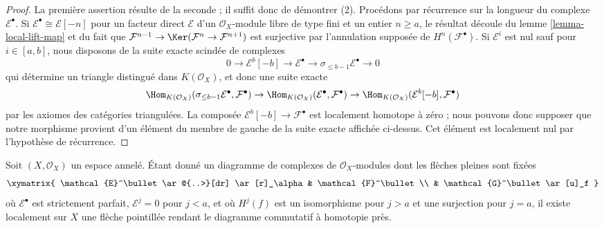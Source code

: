 {\begin{lemma}
\begin{enumerate}
\end{enumerate}

\end{lemma}

\begin{proof}

La première assertion résulte de la seconde ; il suffit donc de démontrer (2). Procédons par récurrence sur la longueur du complexe
$\mathcal{E}^\bullet$. Si $\mathcal{E}^\bullet \cong \mathcal{E}[-n]$
pour un facteur direct $\mathcal{E}$ d'un
$\mathcal{O}_X$-module libre de type fini et un entier $n \geq a$, le résultat découle du lemme \ref{lemma-local-lift-map} et du fait que
$\mathcal{F}^{n - 1} \to \Ker(\mathcal{F}^n \to \mathcal{F}^{n + 1})$
est surjective par l'annulation supposée de $H^n(\mathcal{F}^\bullet)$. Si $\mathcal{E}^i$ est nul sauf pour $i \in [a, b]$, nous disposons de la suite exacte scindée de complexes
$$
0 \to \mathcal{E}^b[-b] \to \mathcal{E}^\bullet \to
\sigma_{\leq b - 1}\mathcal{E}^\bullet \to 0
$$
qui détermine un triangle distingué dans
$K(\mathcal{O}_X)$, et donc une suite exacte
$$
\Hom_{K(\mathcal{O}_X)}(
\sigma_{\leq b - 1}\mathcal{E}^\bullet, \mathcal{F}^\bullet)
\to
\Hom_{K(\mathcal{O}_X)}(\mathcal{E}^\bullet, \mathcal{F}^\bullet)
\to
\Hom_{K(\mathcal{O}_X)}(\mathcal{E}^b[-b], \mathcal{F}^\bullet)
$$
par les axiomes des catégories triangulées. La composée
$\mathcal{E}^b[-b] \to \mathcal{F}^\bullet$ est localement homotope à zéro ; nous pouvons donc supposer que notre morphisme provient d'un élément du membre de gauche de la suite exacte affichée ci-dessus. Cet élément est localement nul par l'hypothèse de récurrence.

\end{proof}

\begin{lemma}

\label{lemma-lift-through-quasi-isomorphism}
Soit $(X, \mathcal{O}_X)$ un espace annelé. Étant donné un diagramme de complexes de $\mathcal{O}_X$-modules dont les flèches pleines sont fixées $$
\xymatrix{
\mathcal{E}^\bullet \ar@{..>}[dr] \ar[r]_\alpha & \mathcal{F}^\bullet \\
& \mathcal{G}^\bullet \ar[u]_f
}
$$ où $\mathcal{E}^\bullet$ est strictement parfait, $\mathcal{E}^j = 0$ pour $j < a$, et où $H^j(f)$ est un isomorphisme pour $j > a$ et une surjection pour $j = a$, il existe localement sur $X$ une flèche pointillée rendant le diagramme commutatif à homotopie près.
\end{lemma}

}

